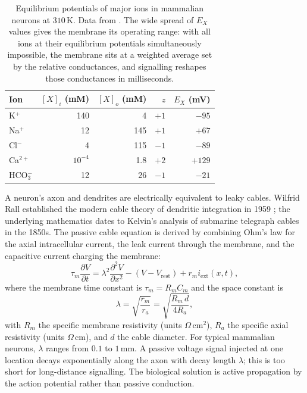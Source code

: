 \begin{table}[htbp]
\centering
\begin{tabular}{lrrrr}
\toprule
Ion & $[X]_i$ (mM) & $[X]_o$ (mM) & $z$ & $E_X$ (mV) \\
\midrule
K$^+$  & 140 & 4   & $+1$ & $-95$ \\
Na$^+$ & 12  & 145 & $+1$ & $+67$ \\
Cl$^-$ & 4   & 115 & $-1$ & $-89$ \\
Ca$^{2+}$ & $10^{-4}$ & 1.8 & $+2$ & $+129$ \\
HCO$_3^-$ & 12 & 26 & $-1$ & $-21$ \\
\bottomrule
\end{tabular}
\caption{Equilibrium potentials of major ions in mammalian neurons at
$310\,\si{\kelvin}$. Data from \cite[table 1.1]{text:v6c07-hille-2001}.
The wide spread of $E_X$ values gives the membrane its operating
range: with all ions at their equilibrium potentials simultaneously
impossible, the membrane sits at a weighted average set by the
relative conductances, and signalling reshapes those conductances
in milliseconds.}
\label{tab:vol06:ch07:nernst}
\end{table}

 A neuron's axon and dendrites are electrically
equivalent to leaky cables. Wilfrid Rall established the modern cable
theory of dendritic integration in 1959
\cite{paper:v6c07-rall-1959}; the underlying mathematics dates to
Kelvin's analysis of submarine telegraph cables in the 1850s. The
passive cable equation is derived by combining Ohm's law for the axial
intracellular current, the leak current through the membrane, and
the capacitive current charging the membrane:
\begin{equation}
\tau_m \frac{\partial V}{\partial t} = \lambda^2 \frac{\partial^2 V}{\partial x^2} - (V - V_{\text{rest}}) + r_m i_{\text{ext}}(x,t),
\label{eq:cable}
\end{equation}
where the membrane time constant is $\tau_m = R_m C_m$ and the
space constant is
\begin{equation}
\lambda = \sqrt{\frac{r_m}{r_a}} = \sqrt{\frac{R_m \, d}{4 R_a}},
\label{eq:space-constant}
\end{equation}
with $R_m$ the specific membrane resistivity (units $\Omega\,\text{cm}^2$),
$R_a$ the specific axial resistivity (units $\Omega\,\text{cm}$),
and $d$ the cable diameter. For typical mammalian neurons, $\lambda$
ranges from $0.1$ to $1\,\text{mm}$. A passive voltage signal injected
at one location decays exponentially along the axon with decay length
$\lambda$; this is too short for long-distance signalling. The
biological solution is active propagation by the action potential
rather than passive conduction.

